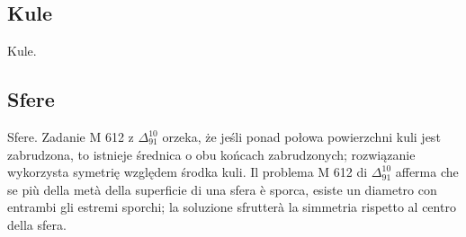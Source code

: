 
%

\subsection{Kule} %
Kule. %
\subsection{Sfere} %
Sfere. %
Zadanie M 612 z $\Delta_{91}^{10}$ orzeka, że jeśli ponad połowa powierzchni kuli jest zabrudzona, to istnieje średnica o obu końcach zabrudzonych; rozwiązanie wykorzysta symetrię względem środka kuli. %
Il problema M 612 di $\Delta_{91}^{10}$ afferma che se più della metà della superficie di una sfera è sporca, esiste un diametro con entrambi gli estremi sporchi; la soluzione sfrutterà la simmetria rispetto al centro della sfera. %

%
